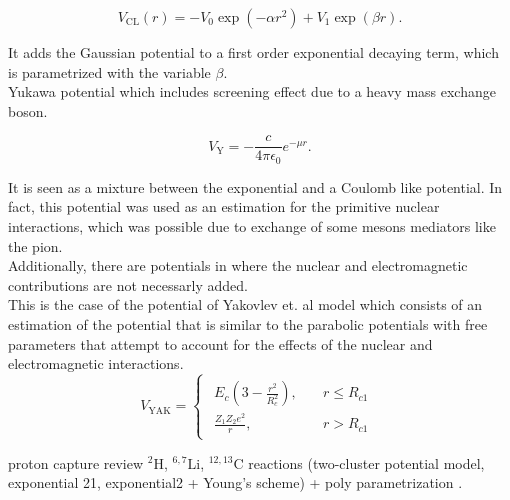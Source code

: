 \documentclass[openany]{book}
\begin{document}
\begin{equation} \label{eq:potential_cluster}
	V_{\mathrm{CL}}(r) = - V_0 \exp{(-\alpha r^2 )} + V_1 \exp{(\beta r)}.
\end{equation}

It adds the Gaussian potential to a first order exponential decaying term, which is parametrized with the variable $\beta$. \\

Yukawa potential  which includes screening effect due to a heavy mass exchange boson.

\begin{equation} \label{eq:potential_Yukawa}
	V_{\mathrm{Y}} = -\frac{c}{4\pi\epsilon_0}e^{-\mu r}.
\end{equation}

It is seen as a mixture between the exponential and a Coulomb like potential. In fact, this potential was used as an estimation for the primitive nuclear interactions, which was possible due to exchange of some mesons mediators like the pion. \\

Additionally, there are potentials in where the nuclear and electromagnetic contributions are not necessarly added. \\

This is the case of the potential of Yakovlev et. al model \cite{yakovlev_beard_gasques_wiescher_2010} which consists of an estimation of the potential that is similar to the parabolic potentials with free parameters that attempt to account for the effects of the nuclear and electromagnetic interactions.  \\

\begin{equation} \label{eq:potential_Yakovlev}
	V_{\mathrm{YAK}} = 	\left\{\begin{array}{l}
		\begin{split}
			E_c\left(3 - \frac{r^2}{R_c^2}\right), \quad &r \le R_{c1} \\ 
			\frac{Z_1Z_2e^2}{r}, \quad &r > R_{c1}	
		\end{split}
	\end{array}\right.
\end{equation}


proton capture review $\mathrm{{}^{2}H}$, $\mathrm{{}^{6,7}Li}$, $\mathrm{^{12, 13}C}$ reactions (two-cluster potential model, exponential 21, exponential2 + Young's scheme) + poly parametrization \cite{dubovichenko_dzhazairov-kakhramanov_2012}. \\
\end{document}
